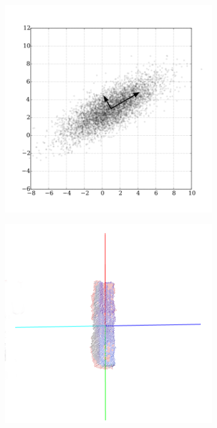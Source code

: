 \begin{figure}[tb]
\centering
\begin{subfigure}[t]{0.45\textwidth}
\includegraphics[width=\textwidth]{Img/pca/pca.png}
\caption{}\label{fig:pca1}
\end{subfigure}
\begin{subfigure}[t]{0.45\textwidth}
\includegraphics[width=\textwidth]{Img/pca/pca2.png}

\end{subfigure}
\end{figure}
